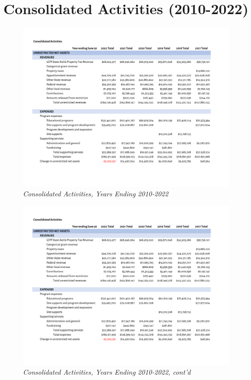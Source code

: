 
\chapter{Consolidated Activities (2010-2022)}\label{ch:consolidated_activities_2010-22}

\begin{figure}
  \caption[Consolidated Activities, Years Ending 2010–2022]{\textit{Consolidated Activities, Years Ending 2010-2022}}\label{fig:consolidated_activities_2010-2022-4} %
  \includegraphics[page=1,width=0.9\textheight]{Consolidated_Activities_Years_2010-2022} %
\end{figure}

\begin{figure}
  \caption*{\textit{Consolidated Activities, Years Ending 2010-2022, cont'd}} %
  \includegraphics[page=2,width=0.9\textheight]{Consolidated_Activities_Years_2010-2022} %
\end{figure}


